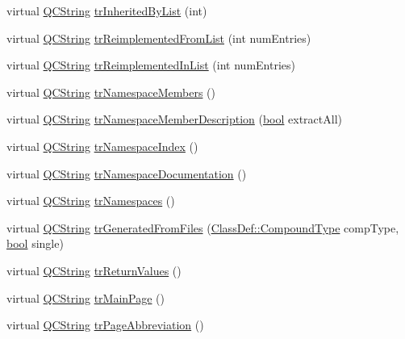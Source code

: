 \begin{DoxyCompactItemize}
virtual \hyperlink{class_q_c_string}{Q\+C\+String} \hyperlink{class_translator_serbian_ad909c2cc73e8ed088f9b37a3567f5ef6}{tr\+Inherited\+By\+List} (int)
\item 
virtual \hyperlink{class_q_c_string}{Q\+C\+String} \hyperlink{class_translator_serbian_ab7fa5ecfcb8a4046516fd67a44dd89b4}{tr\+Reimplemented\+From\+List} (int num\+Entries)
\item 
virtual \hyperlink{class_q_c_string}{Q\+C\+String} \hyperlink{class_translator_serbian_a035c0fb4d8b00e78e0bda87b342ba7dc}{tr\+Reimplemented\+In\+List} (int num\+Entries)
\item 
virtual \hyperlink{class_q_c_string}{Q\+C\+String} \hyperlink{class_translator_serbian_aed20527aa9f88f29bc5f685db1315a7c}{tr\+Namespace\+Members} ()
\item 
virtual \hyperlink{class_q_c_string}{Q\+C\+String} \hyperlink{class_translator_serbian_a852f7f80f8d735683d22ee514e3ef0fd}{tr\+Namespace\+Member\+Description} (\hyperlink{qglobal_8h_a1062901a7428fdd9c7f180f5e01ea056}{bool} extract\+All)
\item 
virtual \hyperlink{class_q_c_string}{Q\+C\+String} \hyperlink{class_translator_serbian_a4e9dbaf6be2b393469a2412b1847a89c}{tr\+Namespace\+Index} ()
\item 
virtual \hyperlink{class_q_c_string}{Q\+C\+String} \hyperlink{class_translator_serbian_a02e4a66d267c2e9e5d3af7e983a0a8a5}{tr\+Namespace\+Documentation} ()
\item 
virtual \hyperlink{class_q_c_string}{Q\+C\+String} \hyperlink{class_translator_serbian_aafd98ed940f0263346635bb228ea4de0}{tr\+Namespaces} ()
\item 
virtual \hyperlink{class_q_c_string}{Q\+C\+String} \hyperlink{class_translator_serbian_aa8b4c7f009f386e5e09e1879cf400e9f}{tr\+Generated\+From\+Files} (\hyperlink{class_class_def_ae70cf86d35fe954a94c566fbcfc87939}{Class\+Def\+::\+Compound\+Type} comp\+Type, \hyperlink{qglobal_8h_a1062901a7428fdd9c7f180f5e01ea056}{bool} single)
\item 
virtual \hyperlink{class_q_c_string}{Q\+C\+String} \hyperlink{class_translator_serbian_aff541c37d8ddcf6b30eb21ea2e4c7ff5}{tr\+Return\+Values} ()
\item 
virtual \hyperlink{class_q_c_string}{Q\+C\+String} \hyperlink{class_translator_serbian_ab853a7762887e5ff90896e45c31f38c2}{tr\+Main\+Page} ()
\item 
virtual \hyperlink{class_q_c_string}{Q\+C\+String} \hyperlink{class_translator_serbian_a75bdd1c8caecedde8d17b1874f776393}{tr\+Page\+Abbreviation} ()

\end{DoxyCompactItemize}
